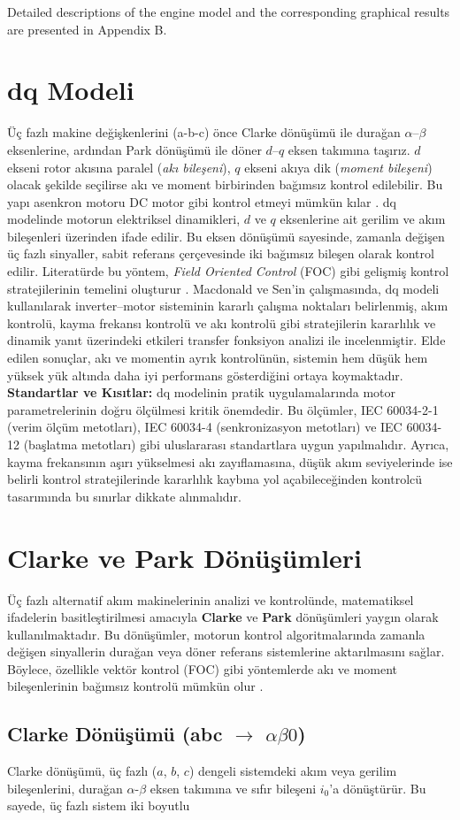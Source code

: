     Detailed descriptions of the engine model and the corresponding graphical results are presented in Appendix B.

\section{dq Modeli} Üç fazlı makine değişkenlerini (a-b-c) önce Clarke dönüşümü ile durağan $\alpha$–$\beta$ eksenlerine, ardından Park dönüşümü ile döner $d$–$q$ eksen takımına taşırız. $d$ ekseni rotor akısına paralel (\textit{akı bileşeni}), $q$ ekseni akıya dik (\textit{moment bileşeni}) olacak şekilde seçilirse akı ve moment birbirinden bağımsız kontrol edilebilir. Bu yapı asenkron motoru DC motor gibi kontrol etmeyi mümkün kılar \cite{macdonald1979dq,leonhard1996control}. dq modelinde motorun elektriksel dinamikleri, $d$ ve $q$ eksenlerine ait gerilim ve akım bileşenleri üzerinden ifade edilir. Bu eksen dönüşümü sayesinde, zamanla değişen üç fazlı sinyaller, sabit referans çerçevesinde iki bağımsız bileşen olarak kontrol edilir. Literatürde bu yöntem, \textit{Field Oriented Control} (FOC) gibi gelişmiş kontrol stratejilerinin temelini oluşturur \cite{blashke1972,sen1989}. Macdonald ve Sen'in \cite{macdonald1979dq} çalışmasında, dq modeli kullanılarak inverter–motor sisteminin kararlı çalışma noktaları belirlenmiş, akım kontrolü, kayma frekansı kontrolü ve akı kontrolü gibi stratejilerin kararlılık ve dinamik yanıt üzerindeki etkileri transfer fonksiyon analizi ile incelenmiştir. Elde edilen sonuçlar, akı ve momentin ayrık kontrolünün, sistemin hem düşük hem yüksek yük altında daha iyi performans gösterdiğini ortaya koymaktadır. \textbf{Standartlar ve Kısıtlar:} dq modelinin pratik uygulamalarında motor parametrelerinin doğru ölçülmesi kritik önemdedir. Bu ölçümler, IEC 60034-2-1 (verim ölçüm metotları), IEC 60034-4 (senkronizasyon metotları) ve IEC 60034-12 (başlatma metotları) gibi uluslararası standartlara uygun yapılmalıdır. Ayrıca, kayma frekansının aşırı yükselmesi akı zayıflamasına, düşük akım seviyelerinde ise belirli kontrol stratejilerinde kararlılık kaybına yol açabileceğinden kontrolcü tasarımında bu sınırlar dikkate alınmalıdır. \section{Clarke ve Park Dönüşümleri} Üç fazlı alternatif akım makinelerinin analizi ve kontrolünde, matematiksel ifadelerin basitleştirilmesi amacıyla \textbf{Clarke} ve \textbf{Park} dönüşümleri yaygın olarak kullanılmaktadır. Bu dönüşümler, motorun kontrol algoritmalarında zamanla değişen sinyallerin durağan veya döner referans sistemlerine aktarılmasını sağlar. Böylece, özellikle vektör kontrol (FOC) gibi yöntemlerde akı ve moment bileşenlerinin bağımsız kontrolü mümkün olur \cite{blashke1972,leonhard1996control}. \subsection{Clarke Dönüşümü (abc $\rightarrow$ $\alpha\beta0$)} Clarke dönüşümü, üç fazlı ($a$, $b$, $c$) dengeli sistemdeki akım veya gerilim bileşenlerini, durağan $\alpha$-$\beta$ eksen takımına ve sıfır bileşeni $i_0$’a dönüştürür. Bu sayede, üç fazlı sistem iki boyutlu 